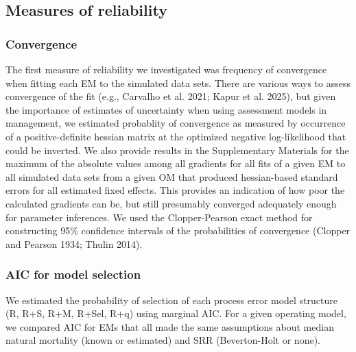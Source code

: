 \documentclass[
  12pt,
]{article}
\begin{document}
\hypertarget{measures-of-reliability}{%
\subsection*{Measures of reliability}\label{measures-of-reliability}}

\hypertarget{convergence}{%
\subsubsection{Convergence}\label{convergence}}

The first measure of reliability we investigated was frequency of
convergence when fitting each EM to the simulated data sets. There are
various ways to assess convergence of the fit (e.g., Carvalho et al.
2021; Kapur et al. 2025), but given the importance of estimates of
uncertainty when using assessment models in management, we estimated
probablity of convergence as measured by occurrence of a
positive-definite hessian matrix at the optimized negative
log-likelihood that could be inverted. We also provide results in the
Supplementary Materials for the maximum of the absolute values among all
gradients for all fits of a given EM to all simulated data sets from a
given OM that produced hessian-based standard errors for all estimated
fixed effects. This provides an indication of how poor the calculated
gradients can be, but still presumably converged adequately enough for
parameter inferences. We used the Clopper-Pearson exact method for
constructing 95\% confidence intervals of the probabilities of
convergence (Clopper and Pearson 1934; Thulin 2014).

\hypertarget{aic-for-model-selection}{%
\subsubsection*{AIC for model selection}\label{aic-for-model-selection}}

We estimated the probability of selection of each process error model
structure (R, R+S, R+M, R+Sel, R+q) using marginal AIC. For a given
operating model, we compared AIC for EMs that all made the same
assumptions about median natural mortality (known or estimated) and SRR
(Beverton-Holt or none).
\end{document}
